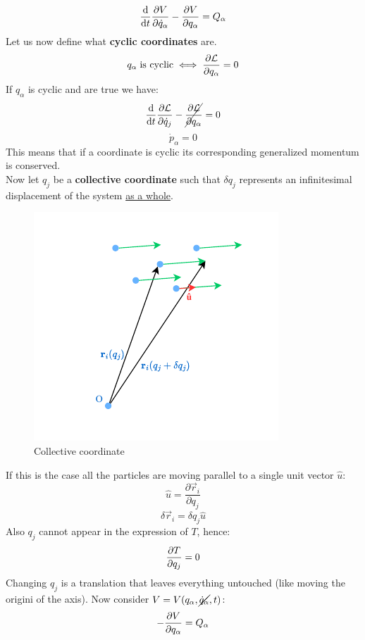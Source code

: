 \begin{equation}
    \dv{}{t}\pdv{V}{\dot{q}_{\alpha}}-\pdv{V}{q_{\alpha}} = Q_{\alpha}
\end{equation}
Let us now define what \textbf{cyclic coordinates} are.
\begin{equation}
    q_{\alpha}\;\text{is cyclic} \iff \pdv{\lagr}{q_{\alpha}} = 0
\end{equation}
If $q_{\alpha}$ is cyclic and \eleref\;are true we have:
\begin{equation}
    \dv{}{t} \pdv{\lagr}{\dot{q}_j} - \cancel{\pdv{\lagr}{q_{\alpha}}} = 0
\end{equation}
\begin{equation}
    \dot{p}_{\alpha} = 0
\end{equation}
This means that if a coordinate is cyclic its corresponding generalized momentum is conserved.\\
Now let $q_j$ be a \textbf{collective coordinate} such that $\delta q_j$ represents an infinitesimal displacement of the system \underline{as a whole}.
\begin{figure}[H]
    \centering
    \includegraphics[width=0.4\linewidth]{res/svg/collectivecoord.drawio}
    \caption{Collective coordinate}
\end{figure}
If this is the case all the particles are moving parallel to a single unit vector $\hat{u}$:
\begin{equation}
    \hat{u} = \dfrac{\partial \vec{r}_i}{\partial q_j}
\end{equation}
\begin{equation}
    \delta \vec{r}_i = \delta q_j \hat{u}
\end{equation}
Also $q_j$ cannot appear in the expression of $T$, hence:
\begin{equation}
    \pdv{T}{q_j}=0
\end{equation}
Changing $q_j$ is a translation that leaves everything untouched (like moving the origini of the axis). Now consider $V=V(q_{\alpha},\cancel{\dot{q}_{\alpha}},t)$:
\begin{equation}
    -\pdv{V}{q_{\alpha}} = Q_{\alpha}
\end{equation}

